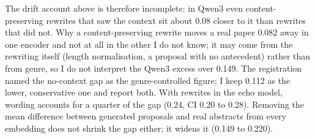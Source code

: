 \documentclass[
  10pt,
]{article}
\begin{document}
The drift account above is therefore
incomplete: in Qwen3 even
content-preserving rewrites that saw the
context sit about 0.08 closer to it than
rewrites that did not. Why a
content-preserving rewrite moves a real
paper 0.082 away in one encoder and not
at all in the other I do not know; it
may come from the rewriting itself
(length normalisation, a proposal with
no antecedent) rather than from genre,
so I do not interpret the Qwen3 excess
over 0.149. The registration named the
no-context gap as the genre-controlled
figure; I keep 0.112 as the lower,
conservative one and report both. With
rewrites in the echo model, wording
accounts for a quarter of the gap (0.24,
CI 0.20 to 0.28). Removing the mean
difference between generated proposals
and real abstracts from every embedding
does not shrink the gap either; it
widens it (0.149 to 0.220).
\end{document}
